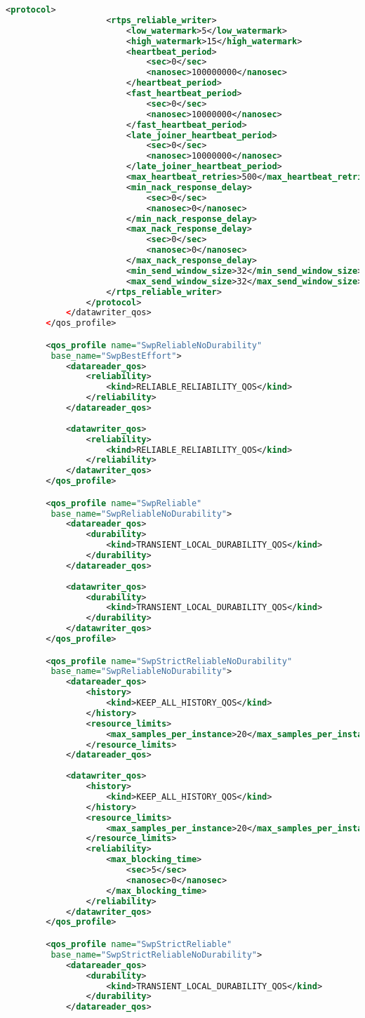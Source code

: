 \begin{lstlisting}[language=XML]
				<protocol>
					<rtps_reliable_writer>
						<low_watermark>5</low_watermark>
						<high_watermark>15</high_watermark>
						<heartbeat_period>
							<sec>0</sec>
							<nanosec>100000000</nanosec>
						</heartbeat_period>
						<fast_heartbeat_period>
							<sec>0</sec>
							<nanosec>10000000</nanosec>
						</fast_heartbeat_period>
						<late_joiner_heartbeat_period>
							<sec>0</sec>
							<nanosec>10000000</nanosec>
						</late_joiner_heartbeat_period>
						<max_heartbeat_retries>500</max_heartbeat_retries>
						<min_nack_response_delay>
							<sec>0</sec>
							<nanosec>0</nanosec>
						</min_nack_response_delay>
						<max_nack_response_delay>
							<sec>0</sec>
							<nanosec>0</nanosec>
						</max_nack_response_delay>
						<min_send_window_size>32</min_send_window_size>
						<max_send_window_size>32</max_send_window_size>
					</rtps_reliable_writer>
				</protocol>
			</datawriter_qos>
		</qos_profile>

		<qos_profile name="SwpReliableNoDurability"
		 base_name="SwpBestEffort">
			<datareader_qos>
				<reliability>
					<kind>RELIABLE_RELIABILITY_QOS</kind>
				</reliability>
			</datareader_qos>
		
			<datawriter_qos>
				<reliability>
					<kind>RELIABLE_RELIABILITY_QOS</kind>
				</reliability>
			</datawriter_qos>
		</qos_profile>

		<qos_profile name="SwpReliable"
		 base_name="SwpReliableNoDurability">
			<datareader_qos>
				<durability>
					<kind>TRANSIENT_LOCAL_DURABILITY_QOS</kind>
				</durability>
			</datareader_qos>
		
			<datawriter_qos>
				<durability>
					<kind>TRANSIENT_LOCAL_DURABILITY_QOS</kind>
				</durability>
			</datawriter_qos>
		</qos_profile>

		<qos_profile name="SwpStrictReliableNoDurability"
		 base_name="SwpReliableNoDurability">
			<datareader_qos>
				<history>
					<kind>KEEP_ALL_HISTORY_QOS</kind>
				</history>
				<resource_limits>
					<max_samples_per_instance>20</max_samples_per_instance>
				</resource_limits>
			</datareader_qos>
		
			<datawriter_qos>
				<history>
					<kind>KEEP_ALL_HISTORY_QOS</kind>
				</history>
				<resource_limits>
					<max_samples_per_instance>20</max_samples_per_instance>
				</resource_limits>
				<reliability>
					<max_blocking_time>
						<sec>5</sec>
						<nanosec>0</nanosec>
					</max_blocking_time>
				</reliability>
			</datawriter_qos>
		</qos_profile>

		<qos_profile name="SwpStrictReliable"
		 base_name="SwpStrictReliableNoDurability">
			<datareader_qos>
				<durability>
					<kind>TRANSIENT_LOCAL_DURABILITY_QOS</kind>
				</durability>
			</datareader_qos>
			

\end{lstlisting}
